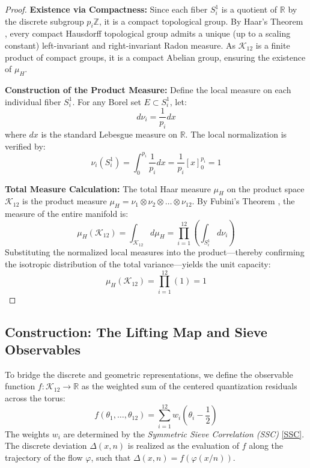 \documentclass[sn-mathphys-num, pdflatex]{sn-jnl}
\begin{document}
\begin{proof}
    \textbf{Existence via Compactness:} Since each fiber $S^1_i$ is a quotient of $\mathbb{R}$ by the discrete subgroup $p_i\mathbb{Z}$, it is a compact topological group. By Haar’s Theorem \cite{folland1995abstract}, every compact Hausdorff topological group admits a unique (up to a scaling constant) left-invariant and right-invariant Radon measure. As $\mathcal{K}_{12}$ is a finite product of compact groups, it is a compact Abelian group, ensuring the existence of $\mu_H$.

    \textbf{Construction of the Product Measure:} Define the local measure on each individual fiber $S^1_i$. For any Borel set $E \subset S^1_i$, let:
    \begin{equation}
    d\nu_i = \frac{1}{p_i} dx
    \end{equation}
    where $dx$ is the standard Lebesgue measure on $\mathbb{R}$. The local normalization is verified by:
    \begin{equation}
    \nu_i(S^1_i) = \int_0^{p_i} \frac{1}{p_i} dx = \frac{1}{p_i} [x]_0^{p_i} = 1
    \end{equation}

    \textbf{Total Measure Calculation:} The total Haar measure $\mu_H$ on the product space $\mathcal{K}_{12}$ is the product measure $\mu_H = \nu_1 \otimes \nu_2 \otimes \dots \otimes \nu_{12}$. By Fubini’s Theorem \cite{rudin1987real}, the measure of the entire manifold is:
    \begin{equation}
    \mu_H(\mathcal{K}_{12}) = \int_{\mathcal{K}_{12}} d\mu_H = \prod_{i=1}^{12} \left( \int_{S^1_i} d\nu_i \right)
    \end{equation}
    Substituting the normalized local measures into the product—thereby confirming the isotropic distribution of the total variance—yields the unit capacity: 
    \begin{equation}
    \mu_H(\mathcal{K}_{12}) = \prod_{i=1}^{12} (1) = 1
    \end{equation}
\end{proof}

\subsection{Construction: The Lifting Map and Sieve Observables}

To bridge the discrete and geometric representations, we define the observable function $f: \mathcal{K}_{12} \to \mathbb{R}$ as the weighted sum of the centered quantization residuals across the torus:
\begin{equation}
f(\theta_1, \dots, \theta_{12}) = \sum_{i=1}^{12} w_i \left( \theta_i - \frac{1}{2} \right)
\end{equation}
The weights $w_i$ are determined by the \textit{Symmetric Sieve Correlation (SSC)} \ref{SSC}. The discrete deviation $\Delta(x, n)$ is realized as the evaluation of $f$ along the trajectory of the flow $\varphi$, such that $\Delta(x, n) = f(\varphi(x/n))$. 
\end{document}
